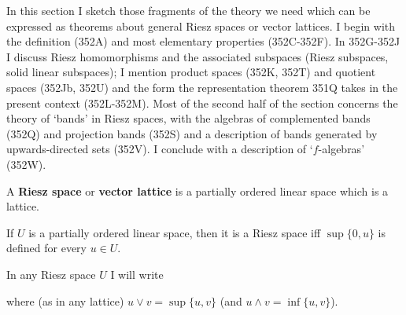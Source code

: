      
\def\chaptername{Riesz spaces}
\def\sectionname{Riesz spaces}
\def\pols{partially ordered linear space}
\def\med{\mathop{\text{med}}}
     
     
In this section I sketch those fragments of the theory we need which can
be expressed as theorems about general Riesz spaces or vector lattices.
I begin with the definition (352A) and most elementary properties
(352C-352F).
In 352G-352J I discuss Riesz homomorphisms and the associated subspaces
(Riesz subspaces, solid linear subspaces);  I mention product spaces
(352K, 352T) and quotient spaces (352Jb, 352U) and the form the
representation theorem 351Q takes in the present context
(352L-352M).   Most of the second half of the section
concerns the theory of `bands' in Riesz spaces, with the algebras of
complemented bands (352Q) and projection bands (352S) and a description
of bands generated by upwards-directed sets (352V).   I conclude with a
description of `$f$-algebras' (352W).
     
 A {\bf Riesz space} or {\bf vector lattice}
is a partially ordered linear space which is a lattice.
     
 If $U$ is a \pols, then it is a Riesz space iff
$\sup\{0,u\}$ is defined for every $u\in U$.
     
     
 In any Riesz space $U$ I will write
     
     
\noindent where (as in any lattice) $u\vee v=\sup\{u,v\}$ (and $u\wedge
v=\inf\{u,v\}$).
     
